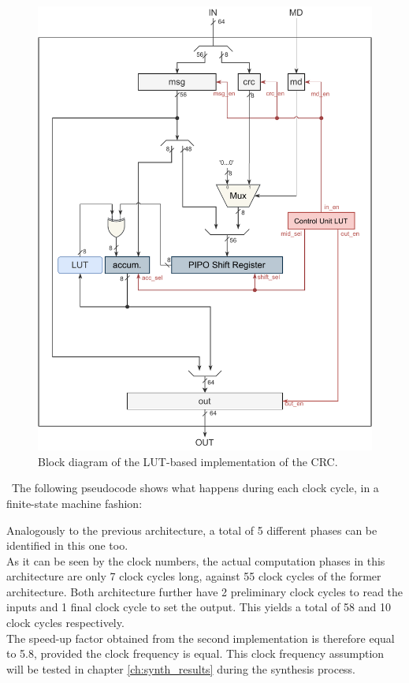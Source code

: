 \begin{figure}[H]
    \begin{center}
        \includegraphics[scale=.85,clip]{img/block_diagram_lut.pdf}
    \end{center}
    \vspace*{-0.5cm}
    \caption{Block diagram of the LUT-based implementation of the CRC.}
    \label{fig:block_diagram_lut}
\end{figure}

\
The following pseudocode shows what happens during each clock cycle, in a finite-state machine fashion:
\hfill \break

\lstset{style=codestyle}\label{code:FSM_LUT}

\hfill \break
Analogously to the previous architecture, a total of 5 different phases can be identified in this one too.\\
\hfill \break
As it can be seen by the clock numbers, the actual computation phases in this architecture are only 7 clock cycles long, against 55 clock cycles of the former architecture. Both architecture further have 2 preliminary clock cycles to read the inputs and 1 final clock cycle to set the output. This yields a total of 58 and 10 clock cycles respectively.\\
The speed-up factor obtained from the second implementation is therefore equal to 5.8, provided the clock frequency is equal. This clock frequency assumption will be tested in chapter \ref{ch:synth_results} during the synthesis process.

